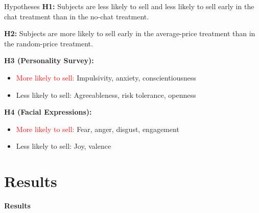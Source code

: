 \documentclass{beamer}
\begin{document}
\begin{frame}{Hypotheses}
\textbf{H1:} Subjects are less likely to sell and less likely to sell early in the chat treatment than in the no-chat treatment.

\vspace{0.3cm}


\textbf{H2:} Subjects are more likely to sell early in the average-price treatment than in the random-price treatment.

\vspace{0.3cm}

\textbf{H3 (Personality Survey):}
\begin{itemize}
    \item \textcolor{red}{More likely to sell:} Impulsivity, anxiety, conscientiousness
    \item \textcolor{green!50!black}{Less likely to sell:} Agreeableness, risk tolerance, openness
\end{itemize}
\vspace{0.3cm}

\textbf{H4 (Facial Expressions):}
\begin{itemize}
    \item \textcolor{red}{More likely to sell:} Fear, anger, disgust, engagement
    \item \textcolor{green!50!black}{Less likely to sell:} Joy, valence
\end{itemize}
\end{frame}



\section{Results}

\begin{frame}{ }
 \begin{center}
     \textbf{Results}
 \end{center}
\end{frame}
\end{document}
